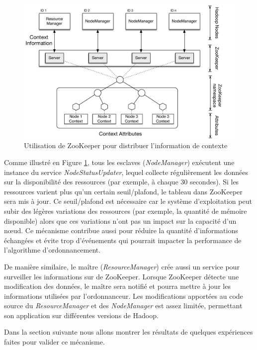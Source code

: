 \begin{figure}
	\centering
	\includegraphics[width=1\linewidth]{img/Zookeeper} 
	\caption{Utilisation de ZooKeeper pour distribuer l'information de contexte\label{fig:zookeeper}}
\end{figure}


Comme illustré en Figure \ref{fig:zookeeper}, tous les esclaves (\textit{NodeManager}) exécutent une instance du service \textit{NodeStatusUpdater}, lequel collecte régulièrement les données sur la disponibilité des ressources (par exemple, à chaque 30 secondes). Si les ressources varient plus qu'un certain seuil/plafond, le tableau dans ZooKeeper sera mis à jour. Ce seuil/plafond est nécessaire car le système d'exploitation peut subir des légères variations des ressources (par exemple, la quantité de mémoire disponible) alors que ces variations n'ont pas un impact sur la capacité d'un n{\oe}ud. Ce mécanisme contribue aussi pour réduire la quantité d'informations échangées et évite trop d'événements qui pourrait impacter la performance de l'algorithme d'ordonnancement. 

De manière similaire, le maître (\textit{ResourceManager}) crée aussi un service pour surveiller les informations sur de ZooKeeper. Lorsque ZooKeeper détecte une modification des données, le maître sera notifié et pourra mettre à jour les informations utilisées par l'ordonnanceur. Les modifications apportées au code source du \textit{ResourceManager} et des \textit{NodeManager} est assez limitée, permettant son application sur différentes versions de Hadoop.

Dans la section suivante nous allons montrer les résultats de quelques expériences faites pour valider ce mécanisme.


